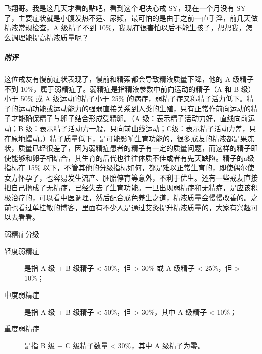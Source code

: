 \begin{case}
    飞翔哥。我是这几天才看的贴吧，看到这个吧决心戒 SY，现在一个月没有 SY 了，主要症状就是小腹发热不适、尿频，最可怕的是由于之前一直手淫，前几天做精液常规检查，A 级精子不到 10\%，我现在很害怕以后不能生孩子，帮帮我，怎么调理能提高精液质量呢？
    \subparagraph{附评} 这位戒友有慢前症状表现了，慢前和精索都会导致精液质量下降，他的 A 级精子不到 10\%，属于弱精症了。弱精症是指精液参数中前向运动的精子（A 和 B 级）小于 50\% 或 A 级运动的精子小于 25\% 的病症，弱精子症又称精子活力低下。精子的运动功能或运动能力的强弱直接关系到人类的生殖，只有正常作前向运动的精子才能确保精子与卵子结合形成受精卵。（A 级：表示精子活动力好，直线向前运动；B 级：表示精子活动力一般，只向前曲线运动；C级：表示精子活动力差，只在原地蠕动。）精子质量低下，是可能影响生育功能的，很多戒友的精液都是果冻状，质量已经很差了，因为弱精症患者的精子有一定的质量问题，而这样的精子即使能够和卵子相结合，其生育的后代也往往体质不佳或者有先天缺陷。精子的a级指标在 15\% 以下，不管其他的分级指标如何，都是难以正常生育的，即使偶尔使女方怀孕了，也容易发生流产、胚胎停育等意外，不利于优生。还有一些戒友直接把自己撸成了无精症，已经失去了生育功能。一旦出现弱精症和无精症，是应该积极治疗的，可以看中医调理，然后配合戒色养生之道，精液质量会慢慢改善的。之前也看过单桂敏的博客，里面有不少人是通过艾灸提升精液质量的，大家有兴趣可以去看看。

    弱精症分级\begin{description}
        \item[轻度弱精症] 是指 A 级 + B 级精子 < 50\%，但 > 30\% 或 A 级精子 < 25\%，但 > 10\%；
        \item[中度弱精症] 是指 A 级 + B 级精子 < 50\%，但 > 30\%，其中 A 级精子 < 10\%；
        \item[重度弱精症] 是指 B 级 + C 级精子数量 < 30\%，其中 A 级精子为零。
    \end{description}
\end{case}

